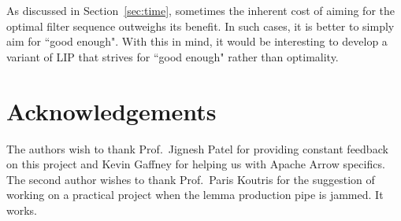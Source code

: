 \documentclass[10pt]{article}
\begin{document}
As discussed in Section~\ref{sec:time}, sometimes the inherent cost of aiming for the optimal filter sequence outweighs its benefit.
In such cases, it is better to simply aim for ``good enough".
With this in mind, it would be interesting to develop a variant of LIP that strives for ``good enough" rather than optimality.





\section*{Acknowledgements}

The authors wish to thank Prof.\ Jignesh Patel for providing constant feedback on this project and Kevin Gaffney for helping us with Apache Arrow specifics. The second author wishes to thank Prof.\ Paris Koutris for the suggestion of working on a practical project when the lemma production pipe is jammed. It works.




\end{document}
